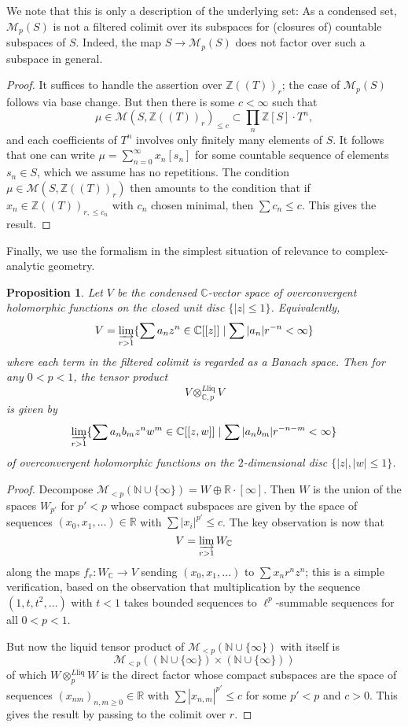\documentclass[11pt]{amsbook}
\numberwithin{equation}{section}
\numberwithin{theorem}{section}
\newtheorem{proposition}[theorem]{Proposition}
\theoremstyle{definition}
\begin{document}
We note that this is only a description of the underlying set: As a condensed set, $\mathcal M_{p}(S)$ is not a filtered colimit over its subspaces for (closures of) countable subspaces of $S$. Indeed, the map $S\to \mathcal M_{p}(S)$ does not factor over such a subspace in general.

\begin{proof} It suffices to handle the assertion over $\mathbb Z((T))_r$; the case of $\mathcal M_p(S)$ follows via base change. But then there is some $c<\infty$ such that
\[
\mu\in \mathcal M(S,\mathbb Z((T))_r)_{\leq c}\subset \prod_n \mathbb Z[S]\cdot T^n,
\]
and each coefficients of $T^n$ involves only finitely many elements of $S$. It follows that one can write $\mu = \sum_{n=0}^\infty x_n [s_n]$ for some countable sequence of elements $s_n\in S$, which we assume has no repetitions. The condition $\mu\in \mathcal M(S,\mathbb Z((T))_r)$ then amounts to the condition that if $x_n\in \mathbb Z((T))_{r,\leq c_n}$ with $c_n$ chosen minimal, then $\sum c_n\leq c$. This gives the result.
\end{proof}

Finally, we use the formalism in the simplest situation of relevance to complex-analytic geometry.

\begin{proposition} Let $V$ be the condensed $\mathbb C$-vector space of overconvergent holomorphic functions on the closed unit disc $\{|z|\leq 1\}$. Equivalently,
\[
V=\varinjlim_{r>1} \{\sum a_n z^n\in \mathbb C[[z]]\mid \sum |a_n|r^{-n}<\infty\}
\]
where each term in the filtered colimit is regarded as a Banach space. Then for any $0<p<1$, the tensor product
\[
V\otimes^{L\mathrm{liq}}_{\mathbb C,p} V
\]
is given by
\[
\varinjlim_{r>1} \{\sum a_n b_m z^n w^m\in \mathbb C[[z,w]]\mid \sum |a_nb_m|r^{-n-m}<\infty\}
\]
of overconvergent holomorphic functions on the $2$-dimensional disc $\{|z|,|w|\leq 1\}$.
\end{proposition}

\begin{proof} Decompose $\mathcal M_{<p}(\mathbb N\cup\{\infty\}) = W\oplus \mathbb R\cdot [\infty]$. Then $W$ is the union of the spaces $W_{p'}$ for $p'<p$ whose compact subspaces are given by the space of sequences $(x_0,x_1,\ldots)\in \mathbb R$ with $\sum |x_i|^{p'}\leq c$. The key observation is now that
\[
V = \varinjlim_{r>1} W_{\mathbb C}
\]
along the maps $f_r: W_{\mathbb C}\to V$ sending $(x_0,x_1,\ldots)$ to $\sum x_n r^n z^n$; this is a simple verification, based on the observation that multiplication by the sequence $(1,t,t^2,\ldots)$ with $t<1$ takes bounded sequences to $\ell^p$-summable sequences for all $0<p<1$.

But now the liquid tensor product of $\mathcal M_{<p}(\mathbb N\cup \{\infty\})$ with itself is
\[
\mathcal M_{<p}((\mathbb N\cup \{\infty\})\times (\mathbb N\cup \{\infty\}))
\]
of which $W\otimes^{L\mathrm{liq}}_p W$ is the direct factor whose compact subspaces are the space of sequences $(x_{nm})_{n,m\geq 0}\in \mathbb R$ with $\sum |x_{n,m}|^{p'}\leq c$ for some $p'<p$ and $c>0$. This gives the result by passing to the colimit over $r$.
\end{proof}
\end{document}
